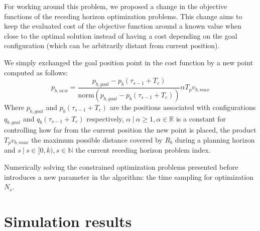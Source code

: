 For working around this problem, we proposed a change in the objective functions
of the receding horizon optimization problems. This change aims to keep the 
evaluated cost of the objective function around a known value when close to the optimal
solution instead of having a cost depending on the goal configuration (which can be arbitrarily distant from current position).

We simply exchanged the goal position point in the cost function by a new point computed as follows:
$$
    p_{b,new} = \frac{p_{b,goal} - p_{b}(\tau_{s-1}+T_c) }{\mathrm{norm}(p_{b,goal} - p_{b}(\tau_{s-1}+T_c) )} \alpha T_pv_{b,max}
$$
Where $p_{b,goal}$ and $p_{b}(\tau_{s-1}+T_c)$ are the positions associated with configurations $q_{b,goal}$ and $q_{b}(\tau_{s-1}+T_c)$ respectively, $\alpha\ |\ 
\alpha \geq 1, \alpha \in \mathbb{R}$ is a constant for controlling how far from the
current position the new point is placed, the product $T_pv_{b,max}$ the maximum possible distance covered by $R_b$ during a planning horizon and $s\ |\ s \in [0, k), s \in \mathbb{N}$ the current receding horizon problem index.

Numerically solving the constrained optimization problems presented before introduces
a new parameter in the algorithm: the time sampling for optimization $N_s$.









\section{Simulation results}




